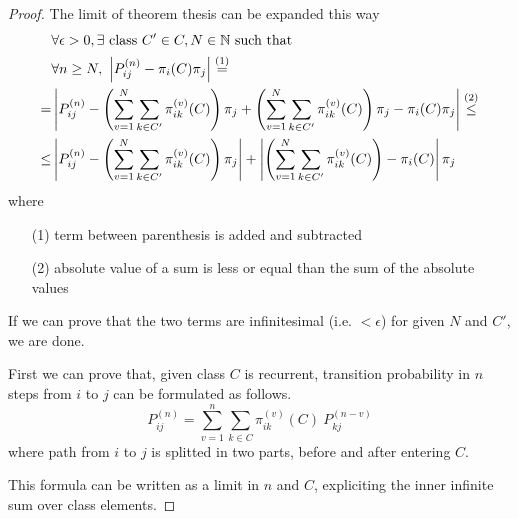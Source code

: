 	\begin{proof}
		The limit of theorem thesis can be expanded this way
		\begin{equation}\begin{split} \label{eq:theorem_3.1_thesis}
			& \forall \epsilon > 0, \exists \text{ class } C' \in C, N \in \mathbb{N} \text{ such that } \\
			& \forall n \ge N,~ \left| P_{ij}^{(n)} - \pi_i(C) \pi_j \right| \stackrel{(1)}{=} \\
			= & \left| P_{ij}^{(n)} - \left( \sum_{v = 1}^{N} \sum_{k \in C'} \pi_{ik}^{(v)}(C) \right) \pi_j +
				\left( \sum_{v = 1}^{N} \sum_{k \in C'} \pi_{ik}^{(v)}(C)\right)\pi_j - \pi_i(C)\pi_j \right| \stackrel{(2)}{\le} \\
			\le & \left| P_{ij}^{(n)} - \left( \sum_{v = 1}^{N} \sum_{k \in C'} \pi_{ik}^{(v)}(C) \right) \pi_j \right| +
				\left| \left( \sum_{v = 1}^{N} \sum_{k \in C'} \pi_{ik}^{(v)}(C)\right) - \pi_i(C) \right| \pi_j
		\end{split}\end{equation}
		where
		\begin{itemize}
			\item [(1)] term between parenthesis is added and subtracted
			\item [(2)] absolute value of a sum is less or equal than the sum of the absolute values
		\end{itemize}

		If we can prove that the two terms are infinitesimal (i.e. $< \epsilon$) for given $N$ and $C'$, we are done.
		\smallbreak

		First we can prove that, given class $C$ is recurrent, transition probability in $n$ steps from $i$ to $j$ can be formulated as follows.
		\begin{equation} \label{eq:n_step_in_class}
			P_{ij}^{(n)} = \sum_{v = 1}^{n} \sum_{k \in C} \pi_{ik}^{(v)}(C) ~ P_{kj}^{(n-v)}
		\end{equation}
		where path from $i$ to $j$ is splitted in two parts, before and after entering $C$.

		This formula can be written as a limit in $n$ and $C$, expliciting the inner infinite sum over class elements.

		\setlength{\mathindent}{-1.5cm} %


\end{proof}
